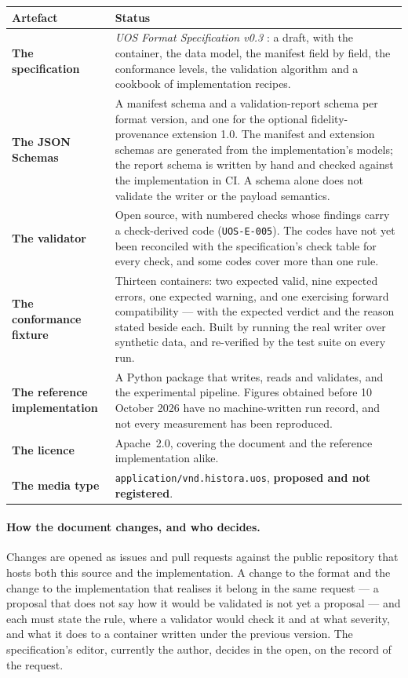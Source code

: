 \documentclass[11pt,a4paper]{article}
\newcommand{\code}[1]{\texttt{\small #1}}
\begin{document}
\begin{longtable}{L{4.6cm} L{10.8cm}}
\toprule
\textbf{Artefact} & \textbf{Status}\\
\midrule
\endhead
\textbf{The specification} & \emph{UOS Format Specification v0.3} \cite{uosspec}: a draft,
with the container, the data model, the manifest field by field, the conformance levels, the
validation algorithm and a cookbook of implementation recipes.\\
\textbf{The JSON Schemas} & A manifest schema and a validation-report schema per format
version, and one for the optional fidelity-provenance extension 1.0. The manifest and
extension schemas are generated from the implementation's models; the report schema is
written by hand and checked against the implementation in CI. A schema alone does not
validate the writer or the payload semantics.\\
\textbf{The validator} & Open source, with numbered checks whose findings carry a
check-derived code (\code{UOS-E-005}). The codes have not yet been reconciled with the
specification's check table for every check, and some codes cover more than one rule.\\
\textbf{The conformance fixture} & Thirteen containers: two expected valid, nine expected errors, one expected warning,
and one exercising forward compatibility --- with the expected verdict and the
reason stated beside each. Built by running the real writer over synthetic data, and
re-verified by the test suite on every run.\\
\textbf{The reference implementation} & A Python package that writes, reads and validates,
and the experimental pipeline. Figures obtained before 10 October 2026 have no
machine-written run record, and not every measurement has been reproduced.\\
\textbf{The licence} & Apache~2.0, covering the document and the reference implementation
alike.\\
\textbf{The media type} & \code{application/vnd.histora.uos}, \textbf{proposed and not
registered}.\\
\bottomrule
\end{longtable}

\paragraph{How the document changes, and who decides.} Changes are opened as issues and pull
requests against the public repository that hosts both this source and the implementation. A
change to the format and the change to the implementation that realises it belong in the same
request --- a proposal that does not say how it would be validated is not yet a proposal ---
and each must state the rule, where a validator would check it and at what severity, and
what it does to a container written under the previous version. The specification's editor,
currently the author, decides in the open, on the record of the request.
\end{document}
